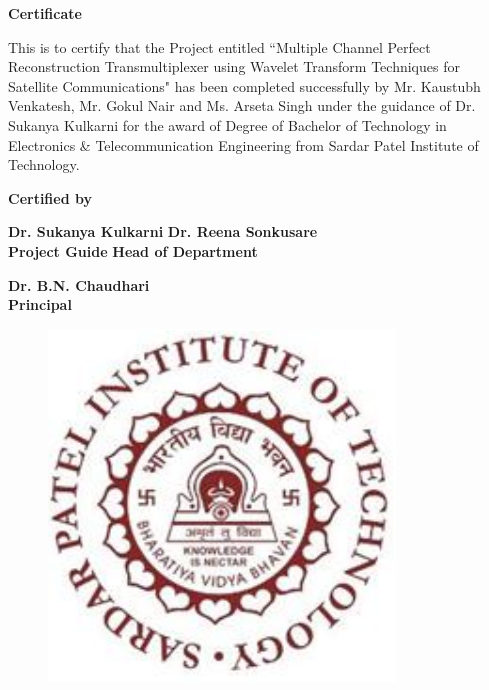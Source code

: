 \thispagestyle{empty}
\vspace*{0.2cm}
\vspace{1cm}
\begin{center}
\large\textbf{Certificate}
\end{center}
\vspace{1cm}
This is to certify that the Project entitled ``Multiple Channel Perfect Reconstruction Transmultiplexer using Wavelet Transform Techniques for Satellite Communications" has been completed successfully by Mr. Kaustubh Venkatesh, Mr. Gokul Nair and Ms. Arseta Singh under the guidance of Dr. Sukanya Kulkarni for the award of Degree of Bachelor of Technology in Electronics \& Telecommunication Engineering from Sardar Patel Institute of Technology.\\
\vspace{1cm}
\begin{center}
\textbf{Certified by}
\end{center}
\vspace{1.5cm}


\textbf {Dr. Sukanya Kulkarni} \hspace{2.37in} \textbf{Dr. Reena Sonkusare}\\ \hspace*{0.5cm}
\textbf {Project Guide} \hspace{3in} \textbf{Head of Department} \\
\vspace{1cm}
 

\begin{center}
\textbf{Dr. B.N. Chaudhari}\\
\textbf{Principal}
\end{center}
 
\begin{figure}[h]
\centering
\includegraphics[scale=0.8]{spitlogo.pdf}

\end{figure}
\hspace{.05cm}
\hspace{.05cm}
 
